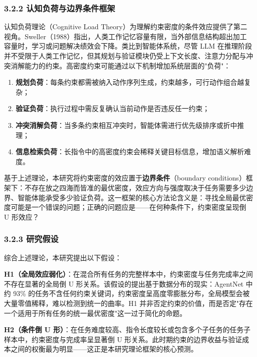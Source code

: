 \documentclass[12pt,a4paper,openany,oneside]{ctexrep}
\begin{document}
\subsubsection{3.2.2 认知负荷与边界条件框架}


认知负荷理论（Cognitive Load Theory）为理解约束密度的条件效应提供了第二视角。Sweller（1988）指出，人类工作记忆容量有限，当外部信息结构超出加工容量时，学习或问题解决绩效会下降。类比到智能体系统，尽管 LLM 在推理阶段并不受限于人类工作记忆，但其规划与验证模块仍受上下文长度、注意力分配与冲突消解能力的约束。高密度约束可能通过以下机制增加系统层面的"负荷"：

\begin{enumerate}
\item[1.] \textbf{规划负荷}：每条约束都需被纳入动作序列生成，约束越多，可行动作组合越复杂；
\item[2.] \textbf{验证负荷}：执行过程中需反复确认当前动作是否违反任一约束；
\item[3.] \textbf{冲突消解负荷}：当多条约束相互冲突时，智能体需进行优先级排序或折中推理；
\item[4.] \textbf{信息检索负荷}：长指令中的高密度约束会稀释关键目标信息，增加语义解析难度。
\end{enumerate}


基于上述理论，本研究将约束密度的效应置于\textbf{边界条件}（boundary conditions）框架下：不存在放之四海而皆准的最优密度，效应方向与强度取决于任务需要多少边界、智能体能承受多少验证负荷。这一框架的核心方法论含义是：寻找全局最优密度可能是一个错误的问题；正确的问题应是——在何种条件下，约束密度呈现倒 U 形效应？

\subsubsection{3.2.3 研究假设}


综合上述理论，本研究提出以下假设：

\textbf{H1（全局效应弱化）}：在混合所有任务的完整样本中，约束密度与任务完成率之间不存在显著的全局倒 U 形关系。该假设的提出基于数据分布的现实：AgentNet 中约 93\% 的任务不含任何约束关键词，约束密度呈高度零膨胀分布，全局模型会被大量零值稀释，难以检测到统一的曲率。H1 并非否定约束的价值，而是否定"存在一个适用于所有任务的统一最优密度"这一过于简化的命题。

\textbf{H2（条件倒 U 形）}：在任务难度较高、指令长度较长或包含多个子任务的任务子样本中，约束密度与完成率呈显著倒 U 形关系。此时期约束的边界收益与验证成本之间的权衡最为明显——这正是本研究理论框架的核心预测。
\end{document}

